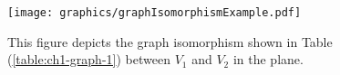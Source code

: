 \begin{figure}[!h]
\begin{center}
\texttt{[image: graphics/graphIsomorphismExample.pdf]}
\end{center} 
\caption{This figure depicts the graph isomorphism shown in Table 
(\ref{table:ch1-graph-1}) between 
$V_1$ and $V_2$ in the plane.}
\label{fig:configuration-3}
\end{figure}


